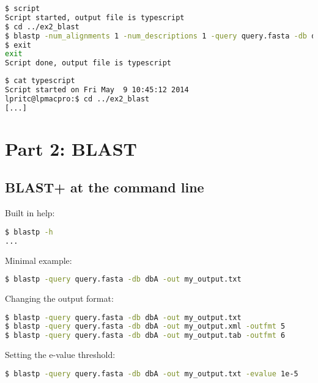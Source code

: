 \documentclass[a4paper]{article}
\begin{document}
\begin{lstlisting}[language=bash]
$ script
Script started, output file is typescript
$ cd ../ex2_blast
$ blastp -num_alignments 1 -num_descriptions 1 -query query.fasta -db dbA
$ exit
exit
Script done, output file is typescript
\end{lstlisting}

\begin{lstlisting}[language=bash]
$ cat typescript
Script started on Fri May  9 10:45:12 2014
lpritc@lpmacpro:$ cd ../ex2_blast
[...]
\end{lstlisting}

\section*{Part 2: BLAST}

\subsection*{BLAST+ at the command line}

Built in help:

\begin{lstlisting}[language=bash]
$ blastp -h
...
\end{lstlisting}

Minimal example:

\begin{lstlisting}[language=bash]
$ blastp -query query.fasta -db dbA -out my_output.txt
\end{lstlisting}

Changing the output format:

\begin{lstlisting}[language=bash]
$ blastp -query query.fasta -db dbA -out my_output.txt
$ blastp -query query.fasta -db dbA -out my_output.xml -outfmt 5
$ blastp -query query.fasta -db dbA -out my_output.tab -outfmt 6
\end{lstlisting}

Setting the e-value threshold:

\begin{lstlisting}[language=bash]
$ blastp -query query.fasta -db dbA -out my_output.txt -evalue 1e-5
\end{lstlisting}
\end{document}
